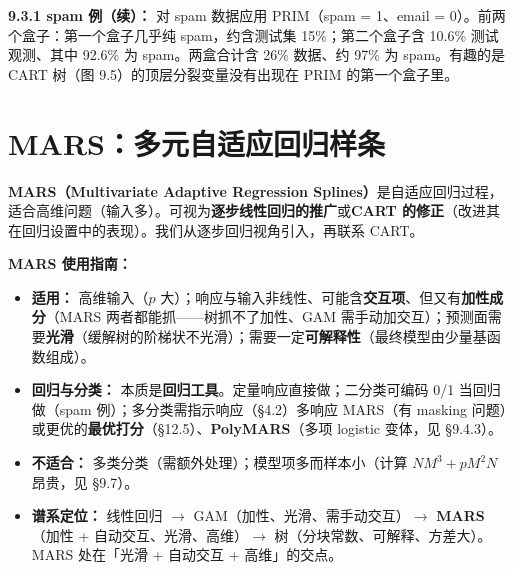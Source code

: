 \textbf{9.3.1 spam 例（续）：} 对 spam 数据应用 PRIM（spam = 1、email = 0）。前两个盒子：第一个盒子几乎纯 spam，约含测试集 15\%；第二个盒子含 10.6\% 测试观测、其中 92.6\% 为 spam。两盒合计含 26\% 数据、约 97\% 为 spam。有趣的是 CART 树（图 9.5）的顶层分裂变量没有出现在 PRIM 的第一个盒子里。

\section{MARS：多元自适应回归样条}

\textbf{MARS（Multivariate Adaptive Regression Splines）}是自适应回归过程，适合高维问题（输入多）。可视为\textbf{逐步线性回归的推广}或\textbf{CART 的修正}（改进其在回归设置中的表现）。我们从逐步回归视角引入，再联系 CART。

\textbf{MARS 使用指南：}
\begin{itemize}
    \item \textbf{适用：} 高维输入（$p$ 大）；响应与输入非线性、可能含\textbf{交互项}、但又有\textbf{加性成分}（MARS 两者都能抓——树抓不了加性、GAM 需手动加交互）；预测面需要\textbf{光滑}（缓解树的阶梯状不光滑）；需要一定\textbf{可解释性}（最终模型由少量基函数组成）。
    \item \textbf{回归与分类：} 本质是\textbf{回归工具}。定量响应直接做；二分类可编码 0/1 当回归做（spam 例）；多分类需指示响应（§4.2）多响应 MARS（有 masking 问题）或更优的\textbf{最优打分}（§12.5）、\textbf{PolyMARS}（多项 logistic 变体，见 §9.4.3）。
    \item \textbf{不适合：} 多类分类（需额外处理）；模型项多而样本小（计算 $NM^3 + pM^2N$ 昂贵，见 §9.7）。
    \item \textbf{谱系定位：} 线性回归 $\to$ GAM（加性、光滑、需手动交互）$\to$ \textbf{MARS}（加性 + 自动交互、光滑、高维）$\to$ 树（分块常数、可解释、方差大）。MARS 处在「光滑 + 自动交互 + 高维」的交点。
\end{itemize}

